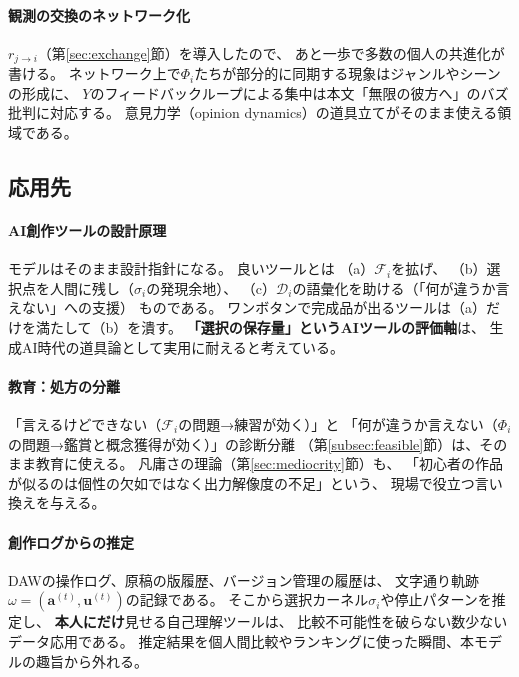 \documentclass[a4paper, fontsize=10pt]{jlreq}
\newcommand{\va}{\bm{a}}
\newcommand{\vu}{\bm{u}}
\newcommand{\Phii}{\Phi_i}
\newcommand{\Fi}{\mathcal{F}_i}
\newcommand{\Di}{\mathcal{D}_i}            %
\newcommand{\traj}{\omega}                 %
\begin{document}
\paragraph{観測の交換のネットワーク化}
$r_{j \to i}$（第\ref{sec:exchange}節）を導入したので、
あと一歩で多数の個人の共進化が書ける。
ネットワーク上で$\Phii$たちが部分的に同期する現象はジャンルやシーンの形成に、
$Y$のフィードバックループによる集中は本文「無限の彼方へ」のバズ批判に対応する。
意見力学（opinion dynamics）の道具立てがそのまま使える領域である。

\subsection{応用先}

\paragraph{AI創作ツールの設計原理}
モデルはそのまま設計指針になる。
良いツールとは
（a）$\Fi$を拡げ、
（b）選択点を人間に残し（$\sigma_i$の発現余地）、
（c）$\Di$の語彙化を助ける（「何が違うか言えない」への支援）
ものである。
ワンボタンで完成品が出るツールは（a）だけを満たして（b）を潰す。
\textbf{「選択の保存量」というAIツールの評価軸}は、
生成AI時代の道具論として実用に耐えると考えている。

\paragraph{教育：処方の分離}
「言えるけどできない（$\Fi$の問題→練習が効く）」と
「何が違うか言えない（$\Phii$の問題→鑑賞と概念獲得が効く）」の診断分離
（第\ref{subsec:feasible}節）は、そのまま教育に使える。
凡庸さの理論（第\ref{sec:mediocrity}節）も、
「初心者の作品が似るのは個性の欠如ではなく出力解像度の不足」という、
現場で役立つ言い換えを与える。

\paragraph{創作ログからの推定}
DAWの操作ログ、原稿の版履歴、バージョン管理の履歴は、
文字通り軌跡$\traj = (\va^{(t)}, \vu^{(t)})$の記録である。
そこから選択カーネル$\sigma_i$や停止パターンを推定し、
\textbf{本人にだけ}見せる自己理解ツールは、
比較不可能性を破らない数少ないデータ応用である。
推定結果を個人間比較やランキングに使った瞬間、本モデルの趣旨から外れる。
\end{document}
